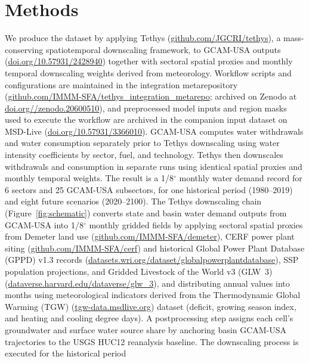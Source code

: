 \documentclass[fleqn,10pt]{wlscirep}
\begin{document}
\section*{Methods}
We produce the dataset by applying Tethys\cite{niazi_2026_20552731} (\href{https://github.com/JGCRI/tethys}{github.com/JGCRI/tethys}), a mass-conserving spatiotemporal downscaling framework, to GCAM-USA outputs\cite{Zhao2024} (\href{https://doi.org/10.57931/2428940}{doi.org/10.57931/2428940}) together with sectoral spatial proxies and monthly temporal downscaling weights derived from meteorology. Workflow scripts and configurations are maintained in the integration metarepository\cite{cambrackenIMMMSFATethys_integration_metarepoV1012026} (\href{https://github.com/IMMM-SFA/tethys_integration_metarepo}{github.com/IMMM-SFA/tethys\_integration\_metarepo}; archived on Zenodo at \href{https://doi.org/10.5281/zenodo.20600510}{doi.org//\allowbreak zenodo.20600510}), and preprocessed model inputs and region masks used to execute the workflow are archived in the companion input dataset on MSD-Live\cite{brackenDataTethys_integration_metarepo} (\href{https://doi.org/10.57931/3366010}{doi.org/10.57931/3366010}). GCAM-USA computes water withdrawals and water consumption separately prior to Tethys downscaling using water intensity coefficients by sector, fuel, and technology\cite{Calvin2019GCAM,Binsted_2022}. Tethys then downscales withdrawals and consumption in separate runs using identical spatial proxies and monthly temporal weights. The result is a 1/8$^{\circ}$ monthly water demand record for 6 sectors and 25 GCAM-USA subsectors, for one historical period (1980--2019) and eight future scenarios (2020--2100). The Tethys downscaling chain (Figure~\ref{fig:schematic}) converts state and basin water demand outputs from GCAM-USA\cite{Zhao_gcamusa_water,Zhao2024,Calvin2019GCAM,Binsted_2022} into 1/8$^{\circ}$ monthly gridded fields by applying sectoral spatial proxies from Demeter land use\cite{Vernon-2018} (\href{https://github.com/IMMM-SFA/demeter}{github.com/IMMM-SFA/demeter}), CERF power plant siting\cite{Vernon2021,Vernon2023GRIDCERF,Mongird2025CERF} (\href{https://github.com/IMMM-SFA/cerf}{github.com/IMMM-SFA/cerf}) and historical Global Power Plant Database (GPPD) v1.3 records\cite{globalpowerplantdb} (\href{https://datasets.wri.org/dataset/globalpowerplantdatabase}{datasets.wri.org/dataset/globalpowerplantdatabase}), SSP population projections\cite{Jones_2016,Jones2020SEDAC,Zoraghein2020Zenodo}, and Gridded Livestock of the World v3 (GLW~3)\cite{Gilbert2018} (\href{https://dataverse.harvard.edu/dataverse/glw_3}{dataverse.harvard.edu/dataverse/glw\_3}), and distributing annual values into months using meteorological indicators derived from the Thermodynamic Global Warming (TGW)\cite{Jones2023TGW} (\href{https://tgw-data.msdlive.org/}{tgw-data.msdlive.org}) dataset (deficit, growing season index, and heating and cooling degree days). A postprocessing step assigns each cell's groundwater and surface water source share by anchoring basin GCAM-USA trajectories to the USGS HUC12 reanalysis baseline\cite{Stets2025USGS,Haynes2023USGS,Luukkonen2023USGS}. The downscaling process is executed for the historical period 
\end{document}

